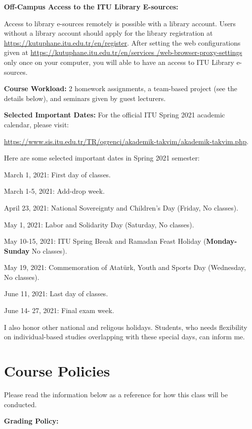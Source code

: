 \documentclass[
  12pt,
]{article}
\begin{document}
\textbf{Off-Campus Access to the ITU Library E-sources:}

Access to library e-sources remotely is possible with a library account.
Users without a library account should apply for the library
registration at
\href{Library register}{https://kutuphane.itu.edu.tr/en/register}. After
setting the web configurations given at
\href{Proxy}{https://kutuphane.itu.edu.tr/en/services \linebreak /web-browser-proxy-settings}
only once on your computer, you will able to have an access to ITU
Library e-sources.

\textbf{Course Workload:} 2 homework assignments, a team-based project
(see the details below), and seminars given by guest lecturers.

\textbf{Selected Important Dates:} For the official ITU Spring 2021
academic calendar, please visit:

\url{https://www.sis.itu.edu.tr/TR/ogrenci/akademik-takvim/akademik-takvim.php}.

Here are some selected important dates in Spring 2021 semester:

March 1, 2021: First day of classes.

March 1-5, 2021: Add-drop week.

April 23, 2021: National Sovereignty and Children's Day (Friday, No
classes).

May 1, 2021: Labor and Solidarity Day (Saturday, No classes).

May 10-15, 2021: ITU Spring Break and Ramadan Feast Holiday
(\textbf{Monday-Sunday} No classes).

May 19, 2021: Commemoration of Atatürk, Youth and Sports Day (Wednesday,
No classes).

June 11, 2021: Last day of classes.

June 14- 27, 2021: Final exam week.

I also honor other national and religous holidays. Students, who needs
flexibility on individual-based studies overlapping with these special
days, can inform me.

\hypertarget{course-policies}{%
\section{Course Policies}\label{course-policies}}

Please read the information below as a reference for how this class will
be conducted.

\textbf{Grading Policy:}
\end{document}
